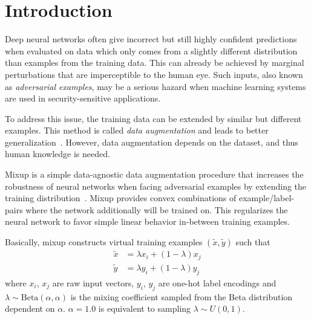 \section{Introduction}
\label{sec:introduction}

Deep neural networks often give incorrect but still highly confident predictions when evaluated on data which only comes from a slightly different distribution than examples from the training data.
This can already be achieved by marginal perturbations that are imperceptible to the human eye.
Such inputs, also known as \textit{adversarial examples}, may be a serious hazard when machine learning systems are used in security-sensitive applications.

To address this issue, the training data can be extended by similar but different examples.
This method is called \textit{data augmentation} and leads to better generalization~\cite{simard96}.
However, data augmentation depends on the dataset, and thus human knowledge is needed.

Mixup is a simple data-agnostic data augmentation procedure that increases the robustness of neural networks when facing adversarial examples by extending the training distribution~\cite{zhang17}.
Mixup provides convex combinations of example/label-pairs where the network additionally will be trained on.
This regularizes the neural network to favor simple linear behavior in-between training examples.

Basically, mixup constructs virtual training examples $(\tilde{x}, \tilde{y})$ such that
\begin{align}
    \tilde{x} &= \lambda x_i + (1 - \lambda) x_j \\
    \tilde{y} &= \lambda y_i + (1 - \lambda) y_j
\end{align}
where $x_i$, $x_j$ are raw input vectors, $y_i$, $y_j$ are one-hot label encodings and $\lambda \sim \text{Beta}(\alpha, \alpha)$ is the mixing coefficient sampled from the Beta distribution dependent on $\alpha$.
$\alpha = 1.0$ is equivalent to sampling $\lambda \sim U(0,1)$.